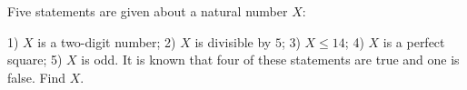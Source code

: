Five statements are given about a natural number $X$:



1) $X$ is a two-digit number; 2) $X$ is divisible by $5$; 3) $X\leqslant14$; 4) $X$ is a perfect square; 5) $X$ is odd. It is known that four of these statements are true and one is false. Find $X$.
